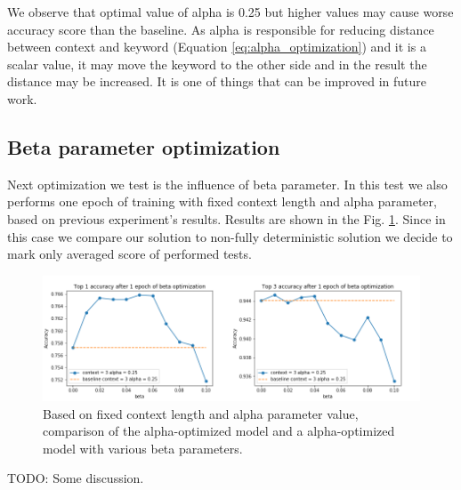 \documentclass{llncs}
\begin{document}
We observe that optimal value of alpha is 0.25 but higher values may cause worse accuracy score than the baseline. As alpha is responsible for reducing distance between context and keyword (Equation \ref{eq:alpha_optimization}) and it is a scalar value, it may move the keyword to the other side and in the result the distance may be increased. It is one of things that can be improved in future work.

\subsection{Beta parameter optimization}
Next optimization we test is the influence of beta parameter. In this test we also performs one epoch of training with fixed context length and alpha parameter, based on previous experiment's results. Results are shown in the Fig. \ref{fig:exp3}. Since in this case we compare our solution to non-fully deterministic solution we decide to mark only averaged score of performed tests.

\begin{figure}
    \label{fig:exp3}
    \caption{Based on fixed context length and alpha parameter value, comparison of the alpha-optimized model and a alpha-optimized model with various beta parameters. }
    \includegraphics[scale=0.5]{res/exp3_beta_top_acc.png}
\end{figure}
TODO: Some discussion.
\end{document}
